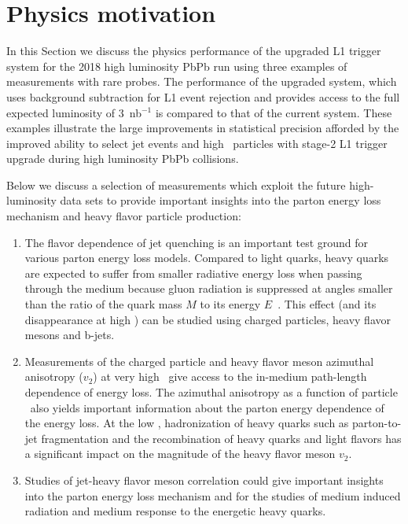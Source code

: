 \section{Physics motivation\label{sec:physHI}}
\label{sec:physics}

In this Section we discuss the physics performance of the upgraded L1 trigger system for the 2018 high luminosity PbPb run using three examples of measurements with rare probes. The performance of the upgraded system, which uses background subtraction for L1 event rejection and provides access to the full expected luminosity of 3~nb$^{-1}$ is compared to that of the current system. 
These examples illustrate the large improvements in statistical precision afforded by the improved ability to select jet events and high \pt\ particles with stage-2 L1 trigger upgrade during high luminosity PbPb collisions. 

Below we discuss a selection of measurements which exploit the future high-luminosity data sets to 
provide important insights into the parton energy loss mechanism and heavy flavor particle production:

\begin{enumerate}
\item The flavor dependence of jet quenching is an important test ground for various parton energy loss models. 
Compared to light quarks, heavy quarks are expected to suffer from smaller radiative energy loss when passing through the medium because gluon radiation is suppressed at angles smaller than the ratio of the quark mass $M$ to its energy $E$~\cite{Dokshitzer:2001zm}. This effect (and its disappearance at high \pt) can be studied using charged particles, heavy flavor mesons and b-jets.
\item Measurements of the charged particle and heavy flavor meson azimuthal anisotropy ($v_2$) at very high \pt\ give access to the in-medium path-length 
dependence of energy loss. The azimuthal anisotropy as a function of particle \pt\ also yields important information about the parton energy dependence of the energy loss.  At the low \pt, hadronization of heavy quarks such as parton-to-jet fragmentation and the recombination of heavy quarks and light flavors has a significant impact on the magnitude of the heavy flavor meson $v_2$. 
\item Studies of jet-heavy flavor meson correlation could give important insights into the parton energy loss mechanism and for the studies of medium induced radiation and medium response to the energetic heavy quarks.
\end{enumerate}

